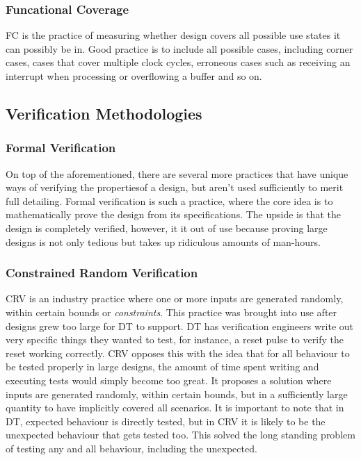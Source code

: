 \documentclass[11pt,british]{article}
\begin{document}
\subsubsection*{Funcational Coverage}
\gls{FC} is the practice of measuring whether design covers all possible use states it can possibly be in. Good practice is to include all possible cases, including corner cases, cases that cover multiple clock cycles, erroneous cases such as receiving an interrupt when processing or overflowing a buffer and so on. 

\subsection{Verification Methodologies}

\subsubsection{Formal Verification}
On top of the aforementioned, there are several more practices that have unique ways of verifying the propertiesof a design, but aren't used sufficiently to merit full detailing. Formal verification is such a practice, where the core idea is to mathematically prove the design from its specifications. The upside is that the design is completely verified, however, it it out of use because proving large designs is not only tedious but takes up ridiculous amounts of man-hours.

\subsubsection{Constrained Random Verification}
\gls{CRV} is an industry practice where one or more inputs are generated randomly, within certain bounds or \emph{constraints}. This practice was brought into use after designs grew too large for \gls{DT} to support. DT has verification engineers write out very specific things they wanted to test, for instance, a reset pulse to verify the reset working correctly. CRV opposes this with the idea that for all behaviour to be tested properly in large designs, the amount of time spent writing and executing tests would simply become too great. It proposes a solution where inputs are generated randomly, within certain bounds, but in a sufficiently large quantity to have implicitly covered all scenarios. It is important to note that in DT, expected behaviour is directly tested, but in CRV it is likely to be the unexpected behaviour that gets tested too. This solved the long standing problem of testing any and all behaviour, including the unexpected.
\end{document}

